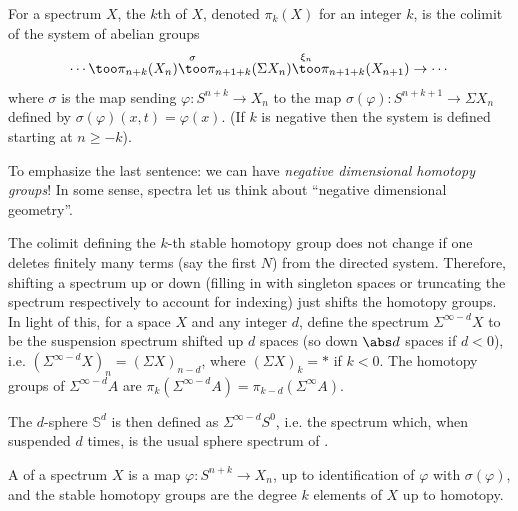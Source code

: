 \documentclass[10pt]{article}
\begin{document}
\begin{definition}
    \label{def:stable-homotopy-groups}
    For a spectrum $X$, the $k$th 
    of $X$, denoted $\pi_k(X)$ for an integer $k$,
    is the colimit of the system of abelian groups
    \begin{equation*}
	\cdots\too
	\pi_{n+k}(X_n)\overset\sigma\too \pi_{n+1+k}(\Sigma X_n)
	\overset{\xi_n}\too \pi_{n+1+k}(X_{n+1})\to\cdots
    \end{equation*}
    where $\sigma$ is the map sending $\varphi\colon S^{n+k}\to X_n$
    to the map $\sigma(\varphi)\colon S^{n+k+1}\to \Sigma X_n$
    defined by $\sigma(\varphi)(x,t) = \varphi(x)$.
    (If $k$ is negative then the system is defined starting at $n \ge -k$).
\end{definition}

To emphasize the last sentence: we can have
\emph{negative dimensional homotopy groups}!
In some sense, spectra let us think about ``negative dimensional geometry''.

\begin{example}
    \label{ex:shifted-spectra}
    The colimit defining the $k$-th stable homotopy group
    does not change if one deletes finitely many terms (say the first $N$)
    from the directed system. Therefore, shifting a spectrum up or down
    (filling in with singleton spaces or truncating the spectrum
    respectively to account for indexing) just shifts the homotopy groups.
    In light of this, for a space $X$ and any integer $d$,
    define the spectrum $\Sigma^{\infty - d}X$
    to be the suspension spectrum shifted up $d$ spaces
    (so down $\abs d$ spaces if $d < 0$),
    i.e. $(\Sigma^{\infty - d}X)_n = (\Sigma X)_{n-d}$,
    where $(\Sigma X)_{k} = *$ if $k < 0$.
    The homotopy groups of $\Sigma^{\infty - d}A$ are
    $\pi_k(\Sigma^{\infty - d}A) = \pi_{k-d}(\Sigma^\infty A)$.

    The $d$-sphere $\mathbb S^d$ is then defined as
    $\Sigma^{\infty - d} S^0$, i.e. the spectrum
    which, when suspended $d$ times, is the usual sphere spectrum
    of .
\end{example}

A  of a spectrum $X$
is a map $\varphi\colon S^{n+k}\to X_n$,
up to identification of $\varphi$ with $\sigma(\varphi)$,
and the stable homotopy groups are
the degree $k$ elements of $X$ up to homotopy.
\end{document}
